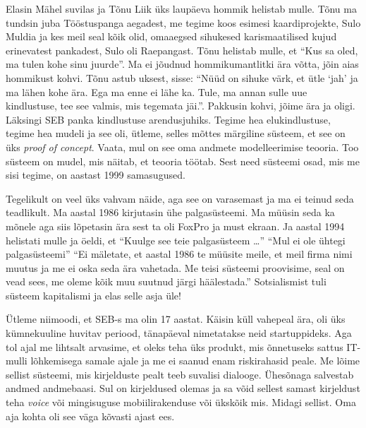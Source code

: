 Elasin Mähel suvilas ja Tõnu Liik üks laupäeva hommik helistab mulle. Tõnu ma tundsin juba Tööstuspanga aegadest, me tegime koos  esimesi kaardiprojekte, Sulo Muldia ja kes meil seal kõik olid, omaaegsed sihukesed karismaatilised kujud erinevatest pankadest, Sulo oli Raepangast. Tõnu helistab mulle, et \enquote{Kus sa oled, ma tulen kohe sinu juurde}. Ma ei jõudnud hommikumantlitki ära võtta, jõin aias hommikust kohvi. Tõnu astub uksest, sisse: \enquote{Nüüd on sihuke värk, et ütle \enquote{jah} ja ma lähen kohe ära. Ega ma enne ei lähe ka. Tule, ma annan sulle uue kindlustuse, tee see valmis, mis tegemata jäi.}.  Pakkusin kohvi, jõime ära ja oligi. Läksingi SEB panka kindlustuse arendusjuhiks. Tegime hea elukindlustuse, tegime hea mudeli ja see oli, ütleme, selles mõttes märgiline süsteem, et see on üks \emph{proof of concept}. Vaata, mul on see oma andmete modelleerimise teooria. Too süsteem on mudel, mis näitab, et teooria töötab. Sest need süsteemi osad, mis me sisi tegime, on aastast 1999 samasugused. 


Tegelikult on veel üks vahvam näide, aga see on varasemast ja ma ei teinud seda teadlikult. Ma aastal 1986 kirjutasin ühe palgasüsteemi. Ma müüsin seda ka mõnele aga siis lõpetasin ära sest ta oli FoxPro ja must ekraan. Ja aastal 1994 helistati mulle ja öeldi, et \enquote{Kuulge see teie palgasüsteem \ldots} \enquote{Mul ei ole ühtegi palgasüsteemi} \enquote{Ei mäletate, et aastal 1986 te müüsite meile, et meil firma nimi muutus ja me ei oska seda ära vahetada. Me teisi  süsteemi proovisime, seal on vead sees, me oleme kõik muu suutnud järgi häälestada.} Sotsialismist tuli süsteem kapitalismi ja elas selle asja üle! 


Ütleme niimoodi, et SEB-s ma olin 17 aastat. Käisin küll vahepeal ära,  oli üks kümnekuuline huvitav periood, tänapäeval nimetatakse neid startuppideks. Aga tol ajal me  lihtsalt arvasime, et oleks teha üks produkt, mis  õnnetuseks sattus IT-mulli lõhkemisega samale ajale ja me ei saanud enam riskirahasid peale. Me lõime sellist süsteemi, mis kirjelduste pealt teeb suvalisi dialooge. Ühesõnaga salvestab andmed andmebaasi. Sul on kirjeldused olemas ja sa võid sellest samast kirjeldust teha \emph{voice} või mingisuguse mobiilirakenduse või ükskõik mis.  Midagi sellist. Oma aja kohta  oli see väga kõvasti ajast ees.

